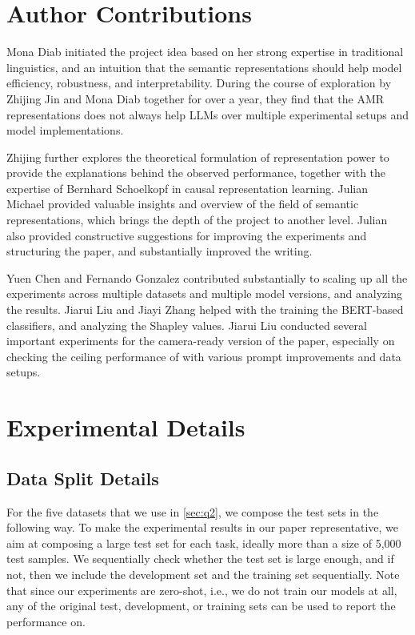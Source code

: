 \begin{enumerate}
\section*{Author Contributions}\label{sec:contributions}
Mona Diab initiated the project idea based on her strong expertise in traditional linguistics, and an intuition that the semantic representations should help model efficiency, robustness, and interpretability. During the course of exploration by Zhijing Jin and Mona Diab together for over a year, they find that the AMR representations does not always help LLMs over multiple experimental setups and model implementations. 

Zhijing further explores the theoretical formulation of representation power to provide the explanations behind the observed performance, together with the expertise of Bernhard Schoelkopf in causal representation learning.
Julian Michael provided valuable insights and overview of the field of semantic representations, which brings the depth of the project to another level. Julian also
provided constructive suggestions for improving the experiments and structuring the paper, and substantially improved the writing. 

Yuen Chen and Fernando Gonzalez contributed substantially to scaling up all the experiments across multiple datasets and multiple model versions, and analyzing the results. Jiarui Liu and Jiayi Zhang helped with the training the BERT-based classifiers, and analyzing the Shapley values. Jiarui Liu conducted several important experiments for the camera-ready version of the paper, especially on checking the ceiling performance of \ourmodel with various prompt improvements and data setups.



\fi




\cleardoublepage

\appendix
\section{Experimental Details}

\subsection{Data Split Details}
\label{appd:split}
For the five datasets that we use in \cref{sec:q2}, we compose the test sets in the following way. To make the experimental results in our paper representative, we aim at composing a large test set for each task, ideally more than a size of 5,000 test samples. We sequentially check whether the test set is large enough, and if not, then we include the development set and the training set sequentially. Note that since our experiments are zero-shot, i.e., we do not train our models at all, any of the original test, development, or training sets can be used to report the performance on.


\end{enumerate}
